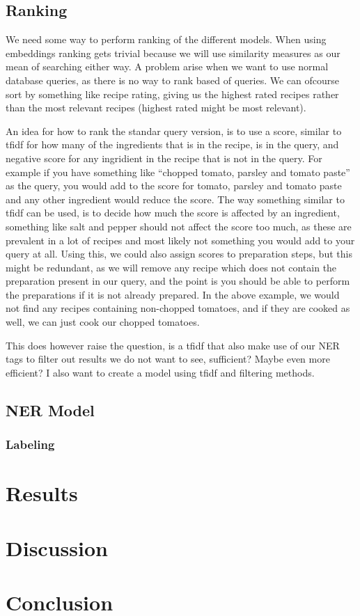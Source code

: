 \documentclass[11pt]{article}
\begin{document}
\subsection{Ranking}
We need some way to perform ranking of the different models.
When using embeddings ranking gets trivial because we will use similarity
measures as our mean of searching either way.
A problem arise when we want to use normal database queries, as there is no way
to rank based of queries.
We can ofcourse sort by something like recipe rating, giving us the highest
rated recipes rather than the most relevant recipes (highest rated might be most
relevant).

An idea for how to rank the standar query version, is to use a score, similar to
tfidf for how many of the ingredients that is in the recipe, is in the query,
and negative score for any ingridient in the recipe that is not in the query.
For example if you have something like ``chopped tomato, parsley and tomato
paste'' as the query, you would add to the score for tomato, parsley and tomato
paste and any other ingredient would reduce the score.
The way something similar to tfidf can be used, is to decide how much the score
is affected by an ingredient, something like salt and pepper should not affect
the score too much, as these are prevalent in a lot of recipes and most likely
not something you would add to your query at all.
Using this, we could also assign scores to preparation steps, but this might be
redundant, as we will remove any recipe which does not contain the preparation
present in our query, and the point is you should be able to perform the
preparations if it is not already prepared.
In the above example, we would not find any recipes containing non-chopped
tomatoes, and if they are cooked as well, we can just cook our chopped tomatoes.

This does however raise the question, is a tfidf that also make use of our NER
tags to filter out results we do not want to see, sufficient? Maybe even more
efficient?
I also want to create a model using tfidf and filtering methods.
\subsection{NER Model}
\subsubsection{Labeling}

\section{Results}
\section{Discussion}
\section{Conclusion}
\end{document}
